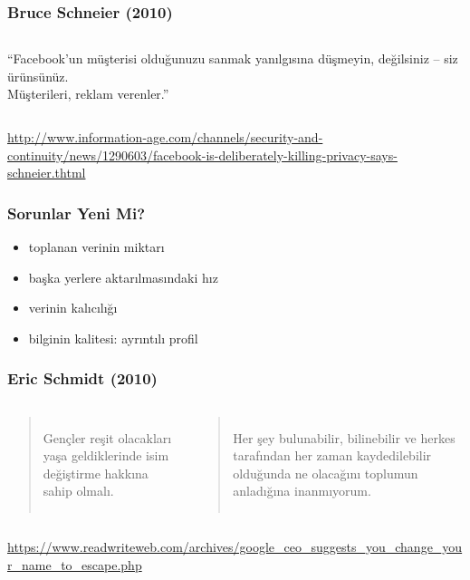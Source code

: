 \documentclass[dvipsnames]{beamer}
\theoremstyle{definition}
\theoremstyle{example}
\theoremstyle{plain}
\begin{document}
\begin{frame}
  \frametitle{Bruce Schneier (2010)}

  \begin{columns}

    ``Facebook'un müşterisi olduğunuzu sanmak yanılgısına düşmeyin, değilsiniz
      -- siz ürünsünüz.\\
      Müşterileri, reklam verenler.''
  \end{columns}

  \medskip
  \tiny{\url{http://www.information-age.com/channels/security-and-continuity/news/1290603/facebook-is-deliberately-killing-privacy-says-schneier.thtml}}\\
\end{frame}

\begin{frame}
  \frametitle{Sorunlar Yeni Mi?}

  \begin{itemize}
    \item toplanan verinin miktarı
    \item başka yerlere aktarılmasındaki hız
    \item verinin kalıcılığı
    \item bilginin kalitesi: ayrıntılı profil
  \end{itemize}
\end{frame}

\begin{frame}
  \frametitle{Eric Schmidt (2010)}

  \begin{columns}

    \begin{quote}
      Gençler reşit olacakları yaşa geldiklerinde isim değiştirme hakkına sahip olmalı.
    \end{quote}

    \pause
    \begin{quote}
      Her şey bulunabilir, bilinebilir ve herkes tarafından her zaman
      kaydedilebilir olduğunda ne olacağını toplumun anladığına inanmıyorum.
    \end{quote}
  \end{columns}

  \medskip
  \tiny{\url{https://www.readwriteweb.com/archives/google_ceo_suggests_you_change_your_name_to_escape.php}}\\
\end{frame}
\end{document}
